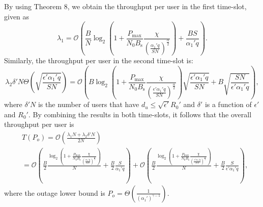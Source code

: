 \documentclass[journal,draftclsnofoot,onecolumn,12pt,twoside]{IEEEtran}
\begin{document}
By using Theorem 8, we obtain the throughput per user in the first time-slot, given as 
\begin{equation}
\lambda_1=\mathcal{O}\left(\frac{B}{N}\log_2\left(1+\frac{P_{\text{max}}}{N_0B_{\text{s}}}\frac{\chi}{\left(\frac{\alpha_1'q}{SN}\right)^\frac{\alpha}{2}}\right)+\frac{BS}{\alpha_1'q}\right).
\end{equation}
Similarly, the throughput per user in the second time-slot is: 
\begin{equation}\label{eq:out_lambda_2_gg1}
\lambda_2\delta' N\Theta\left(\sqrt{\frac{\epsilon'\alpha_1'q}{SN}}\right)=\mathcal{O}\left(B\log_2\left(1+\frac{P_{\text{max}}}{N_0B_{\text{s}}}\frac{\chi}{\left(\frac{\epsilon'\alpha_1'q}{SN}\right)^\frac{\alpha}{2}}\right)\sqrt{\frac{\epsilon'\alpha_1'q}{SN}}+B\sqrt{\frac{SN}{\epsilon'\alpha_1'q}}\right),
\end{equation}
where $\delta'N$ is the number of users that have $d_u\leq\sqrt{\epsilon'} R_0'$ and $\delta'$ is a function of $\epsilon'$ and $R_0'$. By combining the results in both time-slots, it follows that the overall throughput per user is
\begin{equation}
\begin{aligned}\label{eq:out_lambda_final_gg1}
&T(P_o)=\mathcal{O}\left(\frac{\lambda_1 N+ \lambda_2\delta' N }{2N}\right)\\
&=\mathcal{O}\left(\frac{B}{2}\frac{\log_2\left(1+\frac{P_{\text{max}}}{N_0B_{\text{s}}}\frac{\chi}{\left(\frac{\alpha_1'q}{SN}\right)^\frac{\alpha}{2}}\right)}{N}+\frac{B}{2}\frac{S}{\alpha_1'q}\right)+\mathcal{O}\left(\frac{B}{2}\frac{\log_2\left(1+\frac{P_{\text{max}}}{N_0B_{\text{s}}}\frac{\chi}{\left(\frac{\epsilon'\alpha_1'q}{SN}\right)^\frac{\alpha}{2}}\right)}{N}+\frac{B}{2}\frac{S}{\epsilon'\alpha_1'q}\right),
\end{aligned}
\end{equation}
where the outage lower bound is $P_o=\Theta\left(\frac{1}{(\alpha_1')^{\gamma-1}}\right)$.
\end{document}
